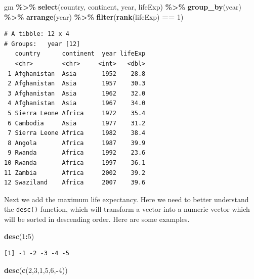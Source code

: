 \documentclass[
]{krantz}
\makeatletter
\newenvironment{Shaded}{\begin{snugshade}}{\end{snugshade}}
\newcommand{\DecValTok}[1]{\textcolor[rgb]{0.06,0.06,0.06}{#1}}
\newcommand{\KeywordTok}[1]{\textcolor[rgb]{0.27,0.27,0.27}{\textbf{#1}}}
\newcommand{\NormalTok}[1]{#1}
\newcommand{\OperatorTok}[1]{\textcolor[rgb]{0.43,0.43,0.43}{\textbf{#1}}}
\newcommand{\StringTok}[1]{\textcolor[rgb]{0.5,0.5,0.5}{#1}}
\newenvironment{kframe}{%
\medskip{}
\setlength{\fboxsep}{.8em}
 \def\at@end@of@kframe{}%
 \ifinner\ifhmode%
  \def\at@end@of@kframe{\end{minipage}}%
  \begin{minipage}{\columnwidth}%
 \fi\fi%
 \def\FrameCommand##1{\hskip\@totalleftmargin \hskip-\fboxsep
 \colorbox{shadecolor}{##1}\hskip-\fboxsep
     \hskip-\linewidth \hskip-\@totalleftmargin \hskip\columnwidth}%
 \MakeFramed {\advance\hsize-\width
   \@totalleftmargin\z@ \linewidth\hsize
   \@setminipage}}%
 {\par\unskip\endMakeFramed%
 \at@end@of@kframe}
\renewenvironment{Shaded}{\begin{kframe}}{\end{kframe}}
\makeatother
\begin{document}
\begin{Shaded}
\begin{Highlighting}[]
\NormalTok{gm }\OperatorTok{\%\textgreater{}\%}\StringTok{ }
\StringTok{  }\KeywordTok{select}\NormalTok{(country, continent, year, lifeExp) }\OperatorTok{\%\textgreater{}\%}\StringTok{ }
\StringTok{  }\KeywordTok{group\_by}\NormalTok{(year) }\OperatorTok{\%\textgreater{}\%}\StringTok{ }
\StringTok{  }\KeywordTok{arrange}\NormalTok{(year) }\OperatorTok{\%\textgreater{}\%}\StringTok{ }
\StringTok{  }\KeywordTok{filter}\NormalTok{(}\KeywordTok{rank}\NormalTok{(lifeExp) }\OperatorTok{==}\StringTok{ }\DecValTok{1}\NormalTok{)}
\end{Highlighting}
\end{Shaded}

\begin{verbatim}
# A tibble: 12 x 4
# Groups:   year [12]
   country      continent  year lifeExp
   <chr>        <chr>     <int>   <dbl>
 1 Afghanistan  Asia       1952    28.8
 2 Afghanistan  Asia       1957    30.3
 3 Afghanistan  Asia       1962    32.0
 4 Afghanistan  Asia       1967    34.0
 5 Sierra Leone Africa     1972    35.4
 6 Cambodia     Asia       1977    31.2
 7 Sierra Leone Africa     1982    38.4
 8 Angola       Africa     1987    39.9
 9 Rwanda       Africa     1992    23.6
10 Rwanda       Africa     1997    36.1
11 Zambia       Africa     2002    39.2
12 Swaziland    Africa     2007    39.6
\end{verbatim}

Next we add the maximum life expectancy. Here we need to better understand the \texttt{desc()} function, which will transform a vector into a numeric vector which will be sorted in descending order. Here are some examples.

\begin{Shaded}
\begin{Highlighting}[]
\KeywordTok{desc}\NormalTok{(}\DecValTok{1}\OperatorTok{:}\DecValTok{5}\NormalTok{)}
\end{Highlighting}
\end{Shaded}

\begin{verbatim}
[1] -1 -2 -3 -4 -5
\end{verbatim}

\begin{Shaded}
\begin{Highlighting}[]
\KeywordTok{desc}\NormalTok{(}\KeywordTok{c}\NormalTok{(}\DecValTok{2}\NormalTok{,}\DecValTok{3}\NormalTok{,}\DecValTok{1}\NormalTok{,}\DecValTok{5}\NormalTok{,}\DecValTok{6}\NormalTok{,}\OperatorTok{{-}}\DecValTok{4}\NormalTok{))}
\end{Highlighting}
\end{Shaded}
\end{document}
